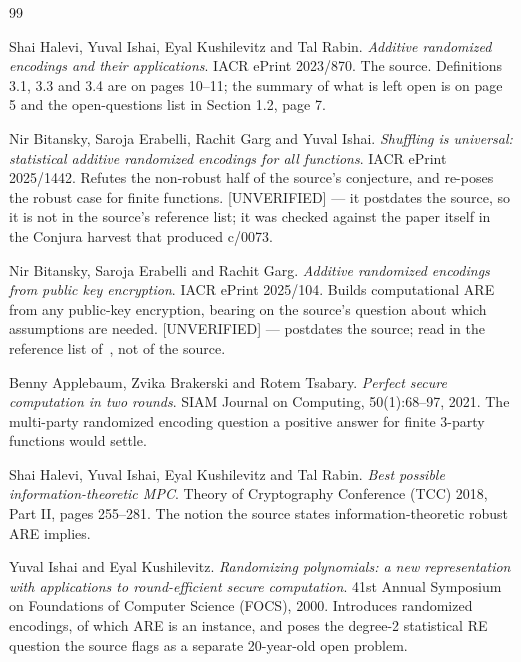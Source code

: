 \documentclass{conjura-conjecture}
\begin{document}
\begin{conjurabibliography}{99}

Shai Halevi, Yuval Ishai, Eyal Kushilevitz and Tal Rabin.
\emph{Additive randomized encodings and their applications}.
IACR ePrint 2023/870.
The source. Definitions 3.1, 3.3 and 3.4 are on pages 10--11; the summary
of what is left open is on page 5 and the open-questions list in
Section 1.2, page 7.

Nir Bitansky, Saroja Erabelli, Rachit Garg and Yuval Ishai.
\emph{Shuffling is universal: statistical additive randomized encodings
for all functions}.
IACR ePrint 2025/1442.
Refutes the non-robust half of the source's conjecture, and re-poses the
robust case for finite functions. [UNVERIFIED] --- it postdates the
source, so it is not in the source's reference list; it was checked
against the paper itself in the Conjura harvest that produced c/0073.

Nir Bitansky, Saroja Erabelli and Rachit Garg.
\emph{Additive randomized encodings from public key encryption}.
IACR ePrint 2025/104.
Builds computational ARE from any public-key encryption, bearing on the
source's question about which assumptions are needed. [UNVERIFIED] ---
postdates the source; read in the reference list of~\cite{BEGI25}, not of
the source.

Benny Applebaum, Zvika Brakerski and Rotem Tsabary.
\emph{Perfect secure computation in two rounds}.
SIAM Journal on Computing, 50(1):68--97, 2021.
The multi-party randomized encoding question a positive answer for finite
$3$-party functions would settle.

Shai Halevi, Yuval Ishai, Eyal Kushilevitz and Tal Rabin.
\emph{Best possible information-theoretic MPC}.
Theory of Cryptography Conference (TCC) 2018, Part II, pages 255--281.
The notion the source states information-theoretic robust ARE implies.

Yuval Ishai and Eyal Kushilevitz.
\emph{Randomizing polynomials: a new representation with applications to
round-efficient secure computation}.
41st Annual Symposium on Foundations of Computer Science (FOCS), 2000.
Introduces randomized encodings, of which ARE is an instance, and poses
the degree-2 statistical RE question the source flags as a separate
20-year-old open problem.

\end{conjurabibliography}
\end{document}
